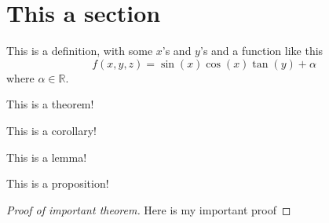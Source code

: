 \documentclass[12pt]{article}
\begin{document}

\tableofcontents
\pagebreak

\section{This a section}
	\begin{defn}
		This is a definition, with some $x$'s and $y$'s and a function like this
		\[
			f(x,y,z) = \sin(x)\cos(x)\tan(y) + \alpha
		\]
		where $\alpha \in \mathbb{R}$.
	\end{defn}
	
	\begin{thm}
		This is a theorem!
	\end{thm}
	
	\begin{crl}
		This is a corollary!
	\end{crl}
	
	\begin{lemma}
		This is a lemma!
	\end{lemma}
	
	\begin{prop}
		This is a proposition!
	\end{prop}
	
	\begin{proof}[Proof of important theorem]
		Here is my important proof
	\end{proof}
\end{document}
